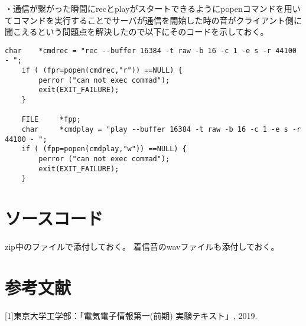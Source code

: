 \documentclass[dvipdfmx]{jsarticle}
\begin{document}
・通信が繋がった瞬間にrecとplayがスタートできるようにpopenコマンドを用いてコマンドを実行することでサーバが通信を開始した時の音がクライアント側に聞こえるという問題点を解決したので以下にそのコードを示しておく。

\begin{lstlisting}[frame = single, basicstyle = \ttfamily\footnotesize]
char	*cmdrec = "rec --buffer 16384 -t raw -b 16 -c 1 -e s -r 44100 - ";
	if ( (fpr=popen(cmdrec,"r")) ==NULL) {
		perror ("can not exec commad");
		exit(EXIT_FAILURE);
	}

    FILE     *fpp;
    char     *cmdplay = "play --buffer 16384 -t raw -b 16 -c 1 -e s -r 44100 - ";
    if ( (fpp=popen(cmdplay,"w")) ==NULL) {
		perror ("can not exec commad");
		exit(EXIT_FAILURE);
	}
\end{lstlisting}

\section{ソースコード}
zip中のファイルで添付しておく。
着信音のwavファイルも添付しておく。

\section{参考文献}
[1]東京大学工学部：「電気電子情報第一(前期) 実験テキスト」, 2019.
\end{document}
